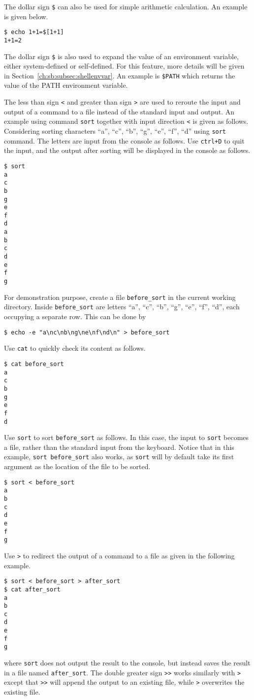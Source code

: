 The dollar sign \verb|$| can also be used for simple arithmetic calculation. An example is given below.
\begin{lstlisting}
$ echo 1+1=$[1+1]
1+1=2
\end{lstlisting}

The dollar sign \verb|$| is also used to expand the value of an environment variable, either system-defined or self-defined. For this feature, more details will be given in Section~\ref{ch:sb:subsec:shellenvvar}. An example is \verb|$PATH| which returns the value of the PATH environment variable.

The less than sign \verb|<| and greater than sign \verb|>| are used to reroute the input and output of a command to a file instead of the standard input and output. An example using command \verb|sort| together with input direction \verb|<| is given as follows. Considering sorting characters ``a'', ``c'', ``b'', ``g'', ``e'', ``f'', ``d'' using \verb|sort| command. The letters are input from the console as follows. Use \verb|ctrl+D| to quit the input, and the output after sorting will be displayed in the console as follows.
\begin{lstlisting}
$ sort
a
c
b
g
e
f
d
a
b
c
d
e
f
g
\end{lstlisting}
For demonstration purpose, create a file \verb|before_sort| in the current working directory. Inside \verb|before_sort| are letters ``a'', ``c'', ``b'', ``g'', ``e'', ``f'', ``d'', each occupying a separate row. This can be done by 
\begin{lstlisting}
$ echo -e "a\nc\nb\ng\ne\nf\nd\n" > before_sort
\end{lstlisting}
Use \verb|cat| to quickly check its content as follows.
\begin{lstlisting}
$ cat before_sort
a
c
b
g
e
f
d
\end{lstlisting}
Use \verb|sort| to sort \verb|before_sort| as follows. In this case, the input to \verb|sort| becomes a file, rather than the standard input from the keyboard. Notice that in this example, \verb|sort before_sort| also works, as \verb|sort| will by default take its first argument as the location of the file to be sorted.
\begin{lstlisting}
$ sort < before_sort
a
b
c
d
e
f
g
\end{lstlisting}
Use \verb|>| to redirect the output of a command to a file as given in the following example.
\begin{lstlisting}
$ sort < before_sort > after_sort
$ cat after_sort
a
b
c
d
e
f
g
\end{lstlisting}
where \verb|sort| does not output the result to the console, but instead saves the result in a file named \verb|after_sort|. The double greater sign \verb|>>| works similarly with \verb|>| except that \verb|>>| will append the output to an existing file, while \verb|>| overwrites the existing file.

